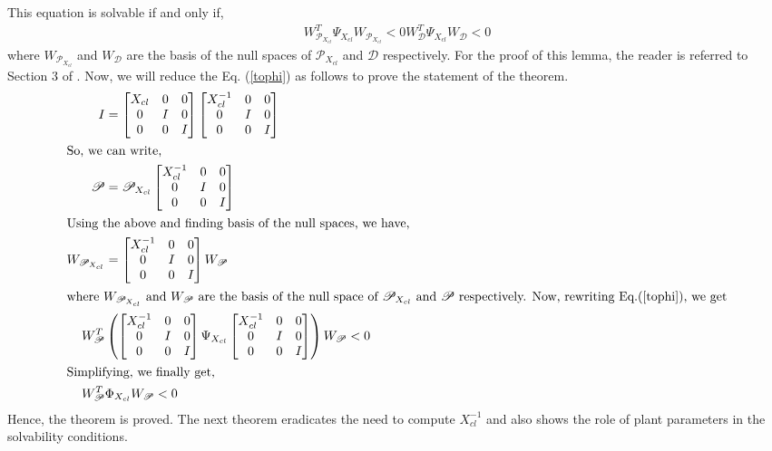 \documentclass[a4paper,12pt]{article}
\begin{document}
	This equation is solvable if and only if,
	\begin{align}
	\label{tophi}
	W_{\mathscr{P}_{X_{cl}}}^{T}\Psi_{X_{cl}}W_{\mathscr{P}_{X_{cl}}} < 0 
	W_{\mathscr{D}}^{T}\Psi_{X_{cl}}W_{\mathscr{D}} < 0 
	\end{align}
	where  $W_{\mathscr{P}_{X_{cl}}}$ and $W_{\mathscr{D}}$ are the basis of the null spaces of $\mathscr{P}_{X_{cl}}$ and $\mathscr{D}$ respectively. For the proof of this lemma, the reader is referred to Section 3 of \cite{Pasca}.
	Now, we will reduce the Eq. (\ref{tophi}) as follows to prove the statement of the theorem.
	\begin{align*}
		I&=\begin{bmatrix}
		X_{cl} & 0 & 0 \\
		0 & I & 0 \\
		0 & 0 & I
		\end{bmatrix}
		\begin{bmatrix}
		X_{cl}^{-1} & 0 & 0 \\
		0 & I & 0 \\
		0 & 0 & I
		\end{bmatrix} \\
		\intertext{So, we can write,}
		\mathscr{P} &= \mathscr{P}_{X_{cl}}\begin{bmatrix}
		X_{cl}^{-1} & 0 & 0 \\
		0 & I & 0 \\
		0 & 0 & I
		\end{bmatrix}	\\
	\intertext{Using the above and finding basis of the null spaces, we have,}
	W_{\mathscr{P}_{X_{cl}}} &= \begin{bmatrix}
	X_{cl}^{-1} & 0 & 0 \\
		0 & I & 0 \\
		0 & 0 & I
	\end{bmatrix} W_{\mathscr{P}}\\
	\intertext{where $W_{\mathscr{P}_{X_{cl}}}$ and $ W_{\mathscr{P}}$ are the basis of the null space of $\mathscr{P}_{X_{cl}}$ and $\mathscr{P}$ respectively. Now, rewriting Eq.(\ref{tophi}), we get}
	W_{\mathscr{P}}^{T}&\left(\begin{bmatrix}
	X_{cl}^{-1} & 0 & 0 \\
		0 & I & 0 \\
		0 & 0 & I
	\end{bmatrix}
	\Psi_{X_{cl}} \begin{bmatrix}
	X_{cl}^{-1} & 0 & 0 \\
		0 & I & 0 \\
		0 & 0 & I
	\end{bmatrix}\right)
	W_{\mathscr{P}} < 0\\
	\intertext{Simplifying, we finally get,}
		W_{\mathscr{P}}^{T}&\Phi_{X_{cl}}W_{\mathscr{P}} < 0
	\end{align*}		
	Hence, the theorem is proved. The next theorem eradicates the need to compute $X_{cl}^{-1}$ and also shows the role of plant parameters in the solvability conditions.
\end{document}
